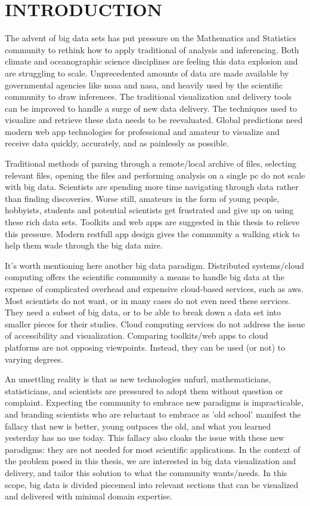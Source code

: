 \chapter{INTRODUCTION}
\label{chap:intro}


The advent of big data sets has put pressure on the Mathematics and Statistics community to rethink how to apply traditional of analysis and inferencing. Both climate and oceanographic science disciplines are feeling this data explosion and are struggling to scale. Unprecedented amounts of data are made available by governmental agencies like \gls{noaa} and \gls{nasa}, and heavily used by the scientific community to draw inferences. The traditional visualization and delivery tools can be improved to handle a surge of new data delivery. The techniques used to visualize and retrieve these data needs to be reevaluated. Global predictions need modern web app technologies for professional and amateur to visualize and receive data quickly, accurately, and as painlessly as possible.

Traditional methods of parsing through a remote/local archive of files, selecting relevant files, opening the files and performing analysis on a single pc do not scale with big data. Scientists are spending more time navigating through data rather than finding discoveries. Worse still, amateurs in the form of young people, hobbyists, students and potential scientists get frustrated and give up on using these rich data sets. Toolkits and web apps are suggested in this thesis to relieve this pressure. Modern \gls{restfull} app design gives the community a walking stick to help them wade through the big data mire.

It's worth mentioning here another big data paradigm. Distributed systems/cloud computing offers the scientific community a means to handle big data at the expense of complicated overhead and expensive cloud-based services, such as \gls{aws}. Most scientists do not want, or in many cases do not even need these services. They need a subset of big data, or to be able to break down a data set into smaller pieces for their studies. Cloud computing services do not address the issue of accessibility and visualization. Comparing toolkits/web apps to cloud platforms are not opposing viewpoints. Instead, they can be used (or not) to varying degrees.

An unsettling reality is that as new technologies unfurl, mathematicians, statisticians, and scientists are pressured to adopt them without question or complaint. Expecting the community to embrace new paradigms is impracticable, and branding scientists who are reluctant to embrace as 'old school' manifest the fallacy that new is better, young outpaces the old, and what you learned yesterday has no use today. This fallacy also cloaks the issue with these new paradigms: they are not needed for most scientific applications. In the context of the problem posed in this thesis, we are interested in big data visualization and delivery, and tailor this solution to what the community wants/needs. In this scope, big data is divided piecemeal into relevant sections that can be visualized and delivered with minimal domain expertise.

